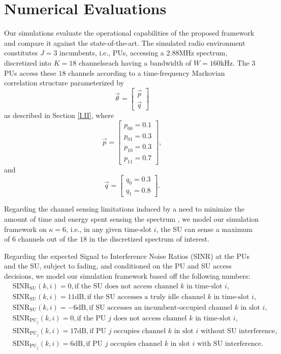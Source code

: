 \section{Numerical Evaluations}\label{III}
Our simulations evaluate the operational capabilities of the proposed framework and compare it against the state-of-the-art. The simulated radio environment constitutes $J{=}3$ incumbents, i.e., PUs, accessing a $2.88$MHz spectrum, discretized into $K{=}18$ channels\text{-}each having a bandwidth of $W{=}160$kHz. The $3$ PUs access these $18$ channels according to a time-frequency Markovian correlation structure parameterized by
\[\vec{\theta}=\begin{bmatrix}
                    \vec{p}\\
                    \vec{q}
               \end{bmatrix}\]
as described in Section \ref{I.II}, where 
\[\vec{p}=\begin{bmatrix}
            p_{00}=0.1\\
            p_{01}=0.3\\
            p_{10}=0.3\\
            p_{11}=0.7
          \end{bmatrix},\]
and
\[\vec{q}=\begin{bmatrix}
            q_{0}=0.3\\
            q_{1}=0.8
          \end{bmatrix}.\]

Regarding the channel sensing limitations induced by a need to minimize the amount of time and energy spent sensing the spectrum \cite{WCL:3}, we model our simulation framework on $\kappa{=}6$, i.e., in any given time-slot $i$, the SU can sense a maximum of $6$ channels out of the $18$ in the discretized spectrum of interest.

Regarding the expected Signal to Interference Noise Ratios (SINR) at the PUs and the SU, subject to fading, and conditioned on the PU and SU access decisions, we model our simulation framework based off the following numbers:
\begin{align*}
    &\text{SINR}_{\text{SU}}(k,i){=}0,\text{if the SU does not access channel $k$ in time-slot $i$,}\\
    &\text{SINR}_{\text{SU}}(k,i){=}11\text{dB},\text{if the SU accesses a truly idle channel $k$ in time-slot $i$,}\\
    &\text{SINR}_{\text{SU}}(k,i){=}-6\text{dB},\text{if SU accesses an incumbent-occupied channel $k$ in slot $i$,}\\
    &\text{SINR}_{\text{PU}_{j}}(k,i){=}0,\text{if the PU $j$ does not access channel $k$ in time-slot $i$,}\\
    &\text{SINR}_{\text{PU}_{j}}(k,i){=}17\text{dB},\text{if PU $j$ occupies channel $k$ in slot $i$ without SU interference,}\\
    &\text{SINR}_{\text{PU}_{j}}(k,i){=}6\text{dB},\text{if PU $j$ occupies channel $k$ in slot $i$ with SU interference.}
\end{align*}

